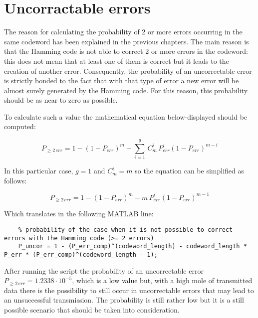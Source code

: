 \vspace{40px} \section{Uncorractable errors} \label{uncorrectable}
The reason for calculating the probability of 2 or more errors occurring in the same codeword has been explained in the previous chapters. The main reason is that the Hamming code is not able to correct 2 or more errors in the codeword: this does not mean that at least one of them is correct but it leads to the creation of another error. Consequently, the probability of an uncorrectable error is strictly bonded to the fact that with that type of error a new error will be almost surely generated by the Hamming code. For this reason, this probability should be as near to zero as possible.

To calculate such a value the mathematical equation below-displayed should be computed:

\begin{equation*}
    P_{\geq2\,err} = 1 - (1 - P_{err})^m - \sum_{i = 1}^g\, C^i_m\,P_{err}^i(1 - P_{err})^{m - i}
\end{equation*}

\noindent In this particular case, $g = 1$ and $C^i_m = m$ so the equation can be simplified as follows:

\begin{equation*}
    P_{\geq2\,err} = 1 - (1 - P_{err})^m - m\,P_{err}^i(1 - P_{err})^{m - 1}
\end{equation*}

\noindent Which translates in the following MATLAB line:

\begin{lstlisting}
    % probability of the case when it is not possible to correct errors with the Hamming code (>= 2 errors)
    P_uncor = 1 - (P_err_comp)^(codeword_length) - codeword_length * P_err * (P_err_comp)^(codeword_length - 1);
\end{lstlisting}

\noindent After running the script the probability of an uncorrectable error $P_{\geq2\,err} = 1.2338\cdot10^{-5}$, which is a low value but, with a high mole of transmitted data there is the possibility to still occur in uncorrectable errors that may lead to an unsuccessful transmission. The probability is still rather low but it is a still possible scenario that should be taken into consideration.

